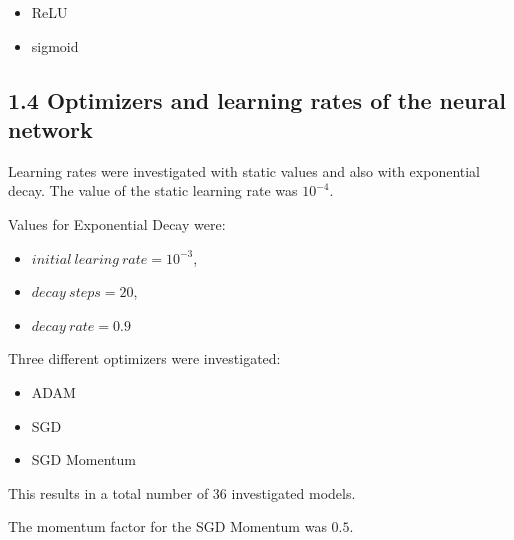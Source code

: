 \begin{itemize}
	\item ReLU 
	\item sigmoid
\end{itemize} 

\subsection*{1.4 Optimizers and learning rates of the neural network}
Learning rates were investigated with static values and also with exponential decay.
The value of the static learning rate was $10^{-4}$.

Values for Exponential Decay were:
\begin{itemize}
	\item $initial\ learing\ rate =  10^{-3}$, 
	\item $decay\ steps=20$, 
	\item $decay\ rate=0.9$
\end{itemize}



Three different optimizers were investigated: 
\begin{itemize}
	\item ADAM
	\item SGD
	\item SGD Momentum
\end{itemize}

This results in a total number of 36 investigated models.

The momentum factor for the SGD Momentum was $0.5$.

